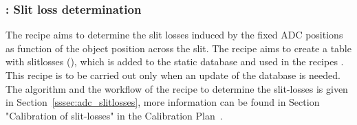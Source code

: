 \subsubsection{: Slit loss determination}
The recipe  aims to determine the slit losses induced by the fixed \ac{ADC} positions as function of the object position across the slit. The recipe aims to create a table with slitlosses (), which is added to the static database and used in the recipes . This recipe is to be carried out only when an update of the database is needed. The algorithm and the workflow of the recipe to determine the slit-losses is given in Section~\ref{sssec:adc_slitlosses}, more information can be found in Section "Calibration of slit-losses" in the Calibration Plan~\cite{METIS-calibration_plan}. 


